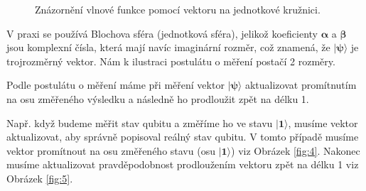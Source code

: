 \begin{figure}[ht]

    \centering

    \caption{\label{fig:3}Znázornění vlnové funkce pomocí vektoru na jednotkové kružnici.}
\end{figure}

V praxi se používá Blochova sféra (jednotková sféra), jelikož koeficienty $\bm{\alpha}$ a $\bm{\beta}$ jsou komplexní čísla, která mají navíc imaginární rozměr, což znamená, že $\bm{|\psi\rangle}$ je trojrozměrný vektor. Nám k ilustraci postulátu o měření postačí 2 rozměry.

Podle postulátu o měření máme při měření vektor $\bm{|\psi\rangle}$ aktualizovat promítnutím na osu změře\-ného výsledku a následně ho prodloužit zpět na délku 1.

Např. když budeme měřit stav qubitu a změříme ho ve stavu $\bm{|1\rangle}$, musíme vektor aktualizovat, aby správně popisoval reálný stav qubitu. V tomto případě musíme vektor promítnout na osu změřeného stavu (osu $\bm{|1\rangle}$) viz Obrázek \ref{fig:4}. Nakonec musíme aktualizovat pravděpodobnost prodloužením vektoru zpět na délku 1 viz Obrázek \ref{fig:5}.

